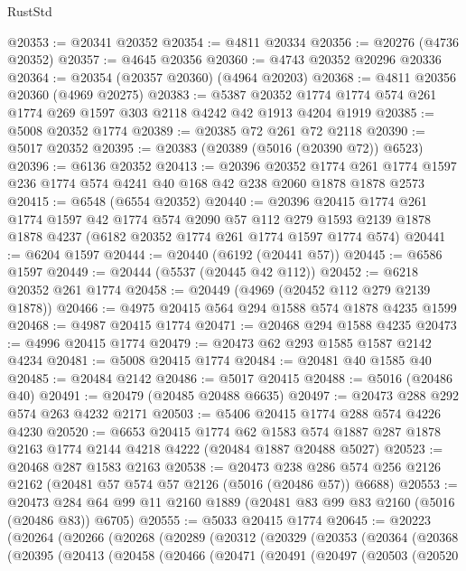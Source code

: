 \begin{lexlean}{RustStd}
\begin{coremodule}
@20353 := @20341 @20352
@20354 := @4811 @20334
@20356 := @20276 (@4736 @20352)
@20357 := @4645 @20356
@20360 := @4743 @20352 @20296 @20336
@20364 := @20354 (@20357 @20360) (@4964 @20203)
@20368 := @4811 @20356 @20360 (@4969 @20275)
@20383 := @5387 @20352 @1774 @1774 @574 @261 @1774 @269 @1597 @303 @2118 @4242 @42 @1913 @4204 @1919
@20385 := @5008 @20352 @1774
@20389 := @20385 @72 @261 @72 @2118
@20390 := @5017 @20352
@20395 := @20383 (@20389 (@5016 (@20390 @72)) @6523)
@20396 := @6136 @20352
@20413 := @20396
    @20352
    @1774
    @261
    @1774
    @1597
    @236
    @1774
    @574
    @4241
    @40
    @168
    @42
    @238
    @2060
    @1878
    @1878
    @2573
@20415 := @6548 (@6554 @20352)
@20440 := @20396
    @20415
    @1774
    @261
    @1774
    @1597
    @42
    @1774
    @574
    @2090
    @57
    @112
    @279
    @1593
    @2139
    @1878
    @1878
    @4237
    (@6182 @20352 @1774 @261 @1774 @1597 @1774 @574)
@20441 := @6204 @1597
@20444 := @20440 (@6192 (@20441 @57))
@20445 := @6586 @1597
@20449 := @20444 (@5537 (@20445 @42 @112))
@20452 := @6218 @20352 @261 @1774
@20458 := @20449 (@4969 (@20452 @112 @279 @2139 @1878))
@20466 := @4975 @20415 @564 @294 @1588 @574 @1878 @4235 @1599
@20468 := @4987 @20415 @1774
@20471 := @20468 @294 @1588 @4235
@20473 := @4996 @20415 @1774
@20479 := @20473 @62 @293 @1585 @1587 @2142 @4234
@20481 := @5008 @20415 @1774
@20484 := @20481 @40 @1585 @40
@20485 := @20484 @2142
@20486 := @5017 @20415
@20488 := @5016 (@20486 @40)
@20491 := @20479 (@20485 @20488 @6635)
@20497 := @20473 @288 @292 @574 @263 @4232 @2171
@20503 := @5406 @20415 @1774 @288 @574 @4226 @4230
@20520 := @6653
    @20415
    @1774
    @62
    @1583
    @574
    @1887
    @287
    @1878
    @2163
    @1774
    @2144
    @4218
    @4222
    (@20484 @1887 @20488 @5027)
@20523 := @20468 @287 @1583 @2163
@20538 := @20473
    @238
    @286
    @574
    @256
    @2126
    @2162
    (@20481 @57 @574 @57 @2126 (@5016 (@20486 @57)) @6688)
@20553 := @20473 @284 @64 @99 @11 @2160 @1889 (@20481 @83 @99 @83 @2160 (@5016 (@20486 @83)) @6705)
@20555 := @5033 @20415 @1774
@20645 := @20223
    (@20264
      (@20266
        (@20268
          (@20289
            (@20312
              (@20329
                (@20353
                  (@20364
                    (@20368
                      (@20395
                        (@20413
                          (@20458
                            (@20466
                              (@20471
                                (@20491
                                  (@20497
                                    (@20503
                                      (@20520

\end{coremodule}
\end{lexlean}
